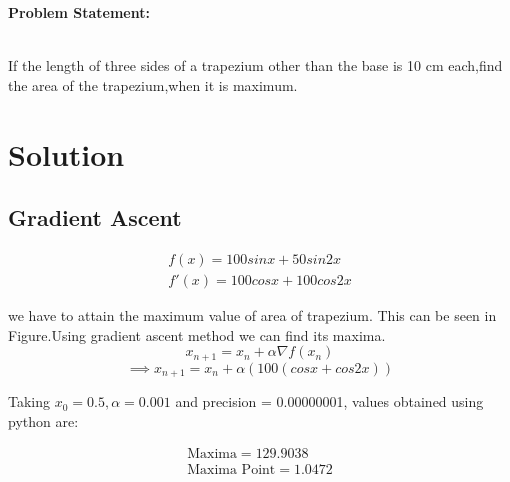 \documentclass[10pt,a4paper]{report}
\begin{document}
\begin{multicols}{2}

\raggedright \textbf{Problem Statement:}\vspace{2mm}
\raggedright \\If the length of three sides of a trapezium other than the base is 10 cm each,find the area of the trapezium,when it is maximum.\\
\vspace{5mm}


\section*{\large Solution}

	
    \subsection*{\normalsize Gradient Ascent}
    
    \begin{align}
	\label{eq:vol_varx}
	f(x) = 100sinx+50sin2x\\
    f'(x) = 100cosx+100cos2x
	\end{align}

we have to attain the maximum value of area of trapezium. This can be seen in Figure.Using gradient ascent method we can find its maxima.
\begin{equation}
        x_{n+1} = x_n + \alpha \nabla f(x_n) 
\end{equation}
\vspace{1mm}
\begin{equation}
\implies x_{n+1}=x_n+\alpha(100(cosx+cos2x))
\end{equation}

Taking $x_0=0.5,\alpha=0.001$ and precision = 0.00000001, values obtained using python are:
    

    \begin{align}
        \boxed{\text{Maxima} = 129.9038}\\     
        \boxed{\text{Maxima Point} = 1.0472}
    \end{align}
  

\end{multicols}
\end{document}
